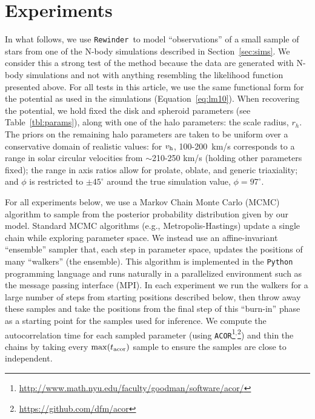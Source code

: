 \documentclass[letterpaper,12pt,preprint]{aastex}
\newcommand{\vhalo}{v_{\rm h}}
\newcommand{\rewinder}{\texttt{Rewinder}}
\begin{document}
\section{Experiments} \label{sec:experiments}
In what follows, we use \rewinder\ to model ``observations'' of a small sample of stars from one of the N-body simulations described in Section~\ref{sec:sims}. We consider this a strong test of the method because the data are generated with N-body simulations and not with anything resembling the likelihood function presented above. For all tests in this article, we use the same functional form for the potential as used in the simulations (Equation~\ref{eq:lm10}). When recovering the potential, we hold fixed the disk and spheroid parameters (see Table~\ref{tbl:params}), along with one of the halo parameters: the scale radius, $r_h$. The priors on the remaining halo parameters are taken to be uniform over a conservative domain of realistic values: for $\vhalo$, 100-200~km/s corresponds to a range in solar circular velocities from $\sim$210-250 km/s (holding other parameters fixed); the range in axis ratios allow for prolate, oblate, and generic triaxiality; and $\phi$ is restricted to $\pm45^\circ$ around the true simulation value, $\phi = 97^\circ$.

For all experiments below, we use a Markov Chain Monte Carlo (MCMC) algorithm to sample from the posterior probability distribution given by our model. Standard MCMC algorithms (e.g., Metropolis-Hastings) update a single chain while exploring parameter space. We instead use an affine-invariant ``ensemble'' sampler \citep{goodman10} that, each step in parameter space, updates the positions of many ``walkers'' (the ensemble). This algorithm is implemented in the \texttt{Python} programming language \citep{foremanmackey13} and runs naturally in a parallelized environment such as the message passing interface (MPI). In each experiment we run the walkers for a large number of steps from starting positions described below, then throw away these samples and take the positions from the final step of this ``burn-in'' phase as a starting point for the samples used for inference. We compute the autocorrelation time for each sampled parameter (using \texttt{ACOR}\footnote{\url{http://www.math.nyu.edu/faculty/goodman/software/acor/}}$^{,}$\footnote{\url{https://github.com/dfm/acor}}) and thin the chains by taking every $\mathrm{max}(t_{\rm acor})$ sample to ensure the samples are close to independent.
\end{document}
